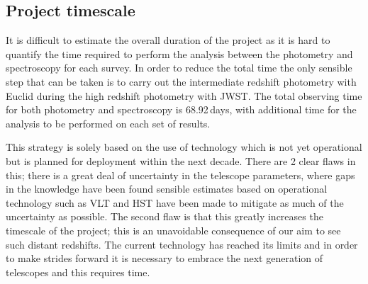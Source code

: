	\subsection{Project timescale} %
	\label{sub:project_timescale}
		It is difficult to estimate the overall duration of the project as it is hard to quantify the time required to perform the analysis between the photometry and spectroscopy for each survey. In order to reduce the total time the only sensible step that can be taken is to carry out the intermediate redshift photometry with Euclid during the high redshift photometry with JWST. The total observing time for both photometry and spectroscopy is 68.92\,days, with additional time for the analysis to be performed on each set of results.

		This strategy is solely based on the use of technology which is not yet operational but is planned for deployment within the next decade. There are 2 clear flaws in this; there is a great deal of uncertainty in the telescope parameters, where gaps in the knowledge have been found sensible estimates based on operational technology such as VLT and HST have been made to mitigate as much of the uncertainty as possible. The second flaw is that this greatly increases the timescale of the project; this is an unavoidable consequence of our aim to see such distant redshifts. The current technology has reached its limits and in order to make strides forward it is necessary to embrace the next generation of telescopes and this requires time.

